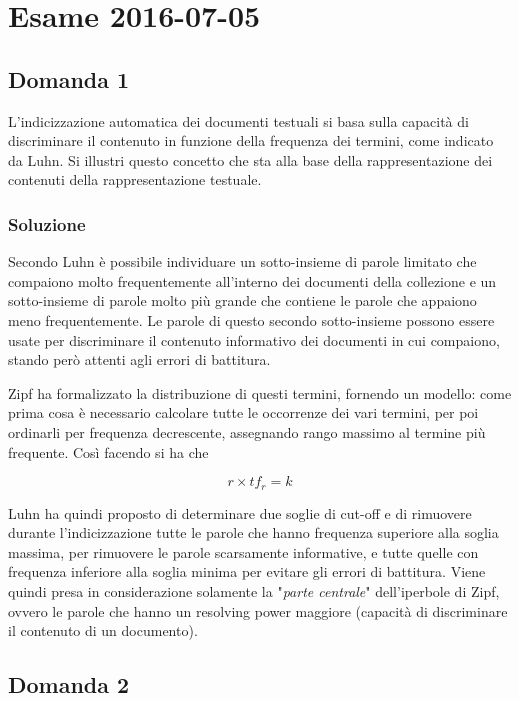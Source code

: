 
\section{Esame 2016-07-05}

\subsection{Domanda 1}

L'indicizzazione automatica dei documenti testuali si basa sulla capacità di discriminare il contenuto in funzione della frequenza dei termini, come indicato da Luhn. Si illustri questo concetto che sta alla base della rappresentazione dei contenuti della rappresentazione testuale.

\subsubsection{Soluzione}

Secondo Luhn è possibile individuare un sotto-insieme di parole limitato che compaiono molto frequentemente all'interno dei documenti della collezione e un sotto-insieme di parole molto più grande che contiene le parole che appaiono meno frequentemente.
Le parole di questo secondo sotto-insieme possono essere usate per discriminare il contenuto informativo dei documenti in cui compaiono, stando però attenti agli errori di battitura.

Zipf ha formalizzato la distribuzione di questi termini, fornendo un modello: come prima cosa è necessario calcolare tutte le occorrenze dei vari termini, per poi ordinarli per frequenza decrescente, assegnando rango massimo al termine più frequente. Così facendo si ha che

$$
r \times tf_r = k
$$

Luhn ha quindi proposto di determinare due soglie di cut-off e di rimuovere durante l'indicizzazione tutte le parole che hanno frequenza superiore alla soglia massima, per rimuovere le parole scarsamente informative, e tutte quelle con frequenza inferiore alla soglia minima per evitare gli errori di battitura. Viene quindi presa in considerazione solamente la "\textit{parte centrale}" dell'iperbole di Zipf, ovvero le parole che hanno un resolving power maggiore (capacità di discriminare il contenuto di un documento).

\subsection{Domanda 2}


